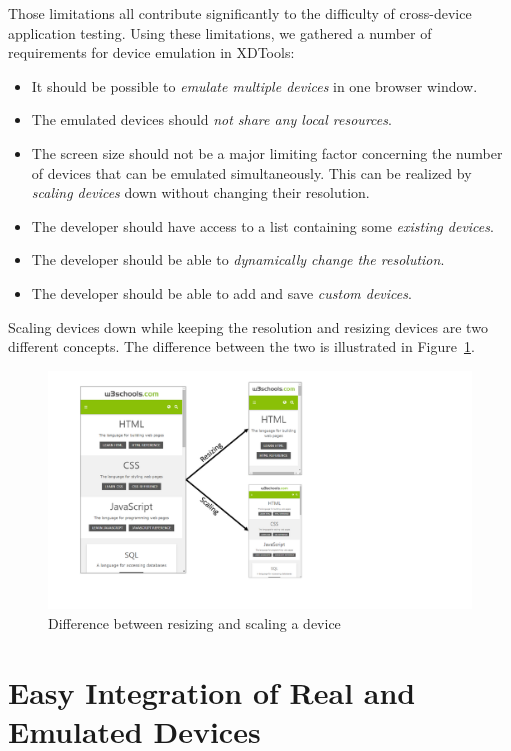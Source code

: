 Those limitations all contribute significantly to the difficulty of cross-device application testing. Using these limitations, we gathered a number of requirements for device emulation in XDTools:
\begin{itemize}
	\item It should be possible to \emph{emulate multiple devices} in one browser window.
	\item The emulated devices should \emph{not share any local resources}.
	\item The screen size should not be a major limiting factor concerning the number of devices that can be emulated simultaneously. This can be realized by \emph{scaling devices} down without changing their resolution.
	\item The developer should have access to a list containing some \emph{existing devices}.
	\item The developer should be able to \emph{dynamically change the resolution}.
	\item The developer should be able to add and save \emph{custom devices}.
\end{itemize}

Scaling devices down while keeping the resolution and resizing devices are two different concepts. The difference between the two is illustrated in Figure~\ref{fig:difference_resizing_scaling}.

\begin{figure}[H]
  \centering
    \includegraphics[width=1.0\textwidth]{images/difference_scaling_resizing.pdf}
	\caption[Difference between resizing and scaling a device]{Difference between resizing and scaling a device}
	\label{fig:difference_resizing_scaling}
\end{figure}

\section{Easy Integration of Real and Emulated Devices}

